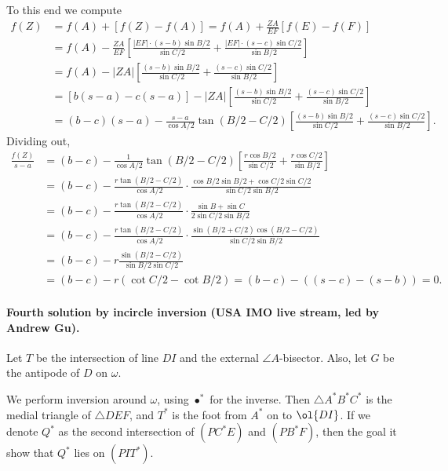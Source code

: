 To this end we compute
\begin{align*}
  f(Z) &= f(A) + \left[ f(Z) - f(A) \right]
    = f(A) + \frac{ZA}{EF} \left[ f(E)-f(F) \right] \\
  &= f(A) - \frac{ZA}{EF}
  \left[ \frac{|EF| \cdot (s-b) \sin B/2}{\sin C/2}
    + \frac{|EF| \cdot (s-c) \sin C/2}{\sin B/2} \right] \\
  &= f(A) - |ZA| \left[ \frac{(s-b) \sin B/2}{\sin C/2}
    + \frac{(s-c) \sin C/2}{\sin B/2} \right] \\
  &= \left[ b(s-a) - c(s-a) \right]
    - |ZA| \left[ \frac{(s-b) \sin B/2}{\sin C/2}
    + \frac{(s-c) \sin C/2}{\sin B/2} \right] \\
  &= (b-c)(s-a) - \frac{s-a}{\cos A/2} \tan (B/2-C/2)
    \left[ \frac{(s-b) \sin B/2}{\sin C/2}
    + \frac{(s-c) \sin C/2}{\sin B/2} \right].
\end{align*}
Dividing out,
\begin{align*}
  \frac{f(Z)}{s-a}
  &= (b-c) - \frac{1}{\cos A/2} \tan (B/2-C/2)
    \left[ \frac{r \cos B/2}{\sin C/2}
      + \frac{r \cos C/2}{\sin B/2} \right] \\
  &= (b-c) - \frac{r \tan(B/2-C/2)}{\cos A/2}
    \cdot \frac{\cos B/2 \sin B/2 + \cos C/2 \sin C/2}%
    {\sin C/2 \sin B/2} \\
  &= (b-c) - \frac{r \tan(B/2-C/2)}{\cos A/2}
    \cdot \frac{\sin B + \sin C}%
    {2\sin C/2 \sin B/2} \\
  &= (b-c) - \frac{r \tan(B/2-C/2)}{\cos A/2}
    \cdot \frac{\sin(B/2+C/2)\cos(B/2-C/2)}
    {\sin C/2 \sin B/2} \\
  &= (b-c) - r \frac{\sin(B/2-C/2)}{\sin B/2 \sin C/2} \\
  &= (b-c) - r(\cot C/2 - \cot B/2)
    = (b-c) - \left( (s-c) - (s-b) \right) = 0.
\end{align*}
\paragraph{Fourth solution by incircle inversion (USA IMO live stream, led by Andrew Gu).}
Let $T$ be the intersection of line $DI$ and the external $\angle A$-bisector.
Also, let $G$ be the antipode of $D$ on $\omega$.

We perform inversion around $\omega$, using $\bullet^\ast$ for the inverse.
Then $\triangle A^\ast B^\ast C^\ast$
is the medial triangle of $\triangle DEF$,
and $T^\ast$ is the foot from $A^\ast$ on to $\ol{DI}$.
If we denote $Q^\ast$ as the second intersection
of $(PC^\ast E)$ and $(PB^\ast F)$,
then the goal it show that $Q^\ast$ lies on $(PIT^\ast)$.

